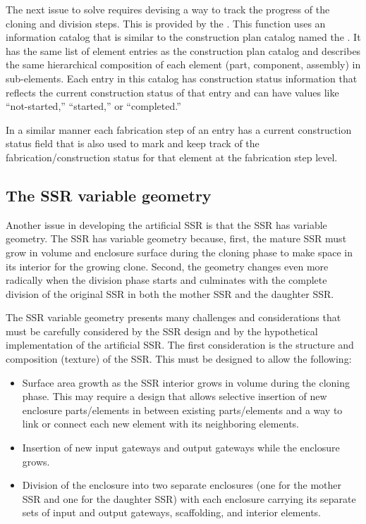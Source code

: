 The next issue to solve requires devising
a way to track the
progress of the cloning and division steps. This is provided by the
. This function uses an
information catalog that is similar to the construction plan catalog named the
. It has 
the same list of element entries as the construction plan
catalog and describes the same hierarchical composition of each element
(part, component, assembly) in sub-elements.  Each entry in this
catalog has construction status information that reflects the current
construction status of that entry and can have values like ``not-started,'' 
``started,'' or ``completed.''

In a similar manner each fabrication step of an entry has a current
construction status field that is also used to mark and keep track of
the fabrication/construction status for that element at the fabrication
step level.

\subsection[The SSR variable geometry]{The SSR variable geometry}

Another issue in developing the artificial SSR is that the SSR has variable
geometry.  The SSR has variable geometry because, first, the mature SSR must 
grow in volume and enclosure surface during the cloning phase to make space 
in its interior for the growing clone. Second, the geometry changes even more 
radically when the division phase
starts and culminates with the complete division of the original SSR in
both the mother SSR and the daughter SSR.

The SSR variable geometry presents many challenges and considerations that must
be carefully considered by the SSR design and by the hypothetical
implementation of the artificial SSR.  
The first consideration is the structure and composition (texture) of the SSR.  This
must be designed to allow the following:
\begin{itemize}
\item Surface area growth as the SSR interior grows in volume during the
cloning phase. This may require a design that allows selective
insertion of new enclosure parts/elements in between existing
parts/elements and a way to link or connect each new
element with its neighboring elements.
\item Insertion of new input gateways and output gateways while the enclosure grows.
\item Division of the enclosure into two separate enclosures (one for
the mother SSR and one for the daughter SSR)  with each enclosure
carrying its separate sets of input and output gateways, 
scaffolding, and interior elements.
\end{itemize}


